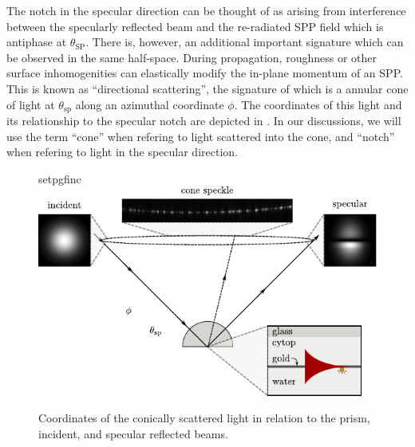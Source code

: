The notch in the specular direction can be thought of as arising from 
interference between the specularly reflected beam and the
re-radiated SPP field which is antiphase at $\theta_\mathrm{SP}$.  There
is, however, an additional important signature which can be observed in the
same half-space.  During propagation, roughness or other surface
inhomogenities can elastically modify the in-plane momentum of an SPP.
This is known as ``directional scattering'', the signature of which is a
annular cone of light at $\theta_\mathrm{sp}$ along an azimuthal coordinate
$\phi$.  The coordinates of this light and its relationship to the specular
notch are depicted in .  In our 
discussions, we will use the term ``cone'' when refering to light scattered
into the cone, and ``notch'' when refering to light in the specular
direction.
\begin{figure}[ht]
 \centering
 {setpgfinc}
 \includegraphics{existence/figures/conefig}
 \caption{Coordinates of the conically scattered light in relation to the
 prism, incident, and specular reflected beams.}
 \label{fig:conefig}
\end{figure}

